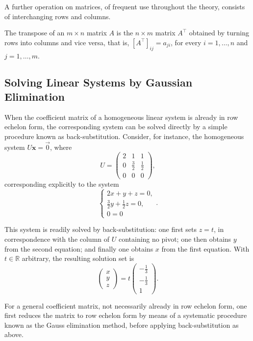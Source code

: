 A further operation on matrices, of frequent use throughout the theory, consists of interchanging rows and columns.

\begin{definition}[Transpose]
The transpose of an $m \times n$ matrix $A$ is the $n \times m$ matrix $A^{\top}$ obtained by turning rows into columns and vice versa, that is, $[A^{\top}]_{ij} = a_{ji}$, for every $i = 1, \dots, n$ and $j = 1, \dots, m$.
\end{definition}
\subsection{Solving Linear Systems by Gaussian Elimination}

When the coefficient matrix of a homogeneous linear system is already in row echelon form, the corresponding system can be solved directly by a simple procedure known as back-substitution. Consider, for instance, the homogeneous system $U\mathbf{x} = \vec{0}$, where
\[
U = \begin{pmatrix} 2 & 1 & 1 \\ 0 & \tfrac{3}{2} & \tfrac{1}{2} \\ 0 & 0 & 0 \end{pmatrix},
\]
corresponding explicitly to the system
\[
\begin{cases}
2x + y + z = 0, \\
\tfrac{3}{2} y + \tfrac{1}{2} z = 0, \\
0 = 0
\end{cases}.
\]

This system is readily solved by back-substitution: one first sets $z = t$, in correspondence with the column of $U$ containing no pivot; one then obtains $y$ from the second equation; and finally one obtains $x$ from the first equation. With $t \in \mathbb{R}$ arbitrary, the resulting solution set is
\[
\begin{pmatrix} x \\ y \\ z \end{pmatrix} = t \begin{pmatrix} -\tfrac{1}{3} \\ -\tfrac{1}{3} \\ 1 \end{pmatrix}.
\]

For a general coefficient matrix, not necessarily already in row echelon form, one first reduces the matrix to row echelon form by means of a systematic procedure known as the Gauss elimination method, before applying back-substitution as above.

